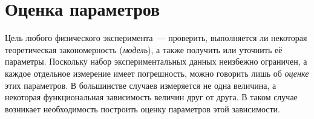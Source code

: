 \chapter{Оценка параметров}
\label{ch:estimate}






Цель любого физического эксперимента~--- проверить, выполняется ли некоторая
теоретическая закономерность (\emph{модель}), а также получить или уточнить
её параметры. Поскольку набор экспериментальных данных неизбежно ограничен,
а каждое отдельное измерение имеет погрешность, можно говорить лишь
об \emph{оценке} этих параметров. В большинстве случаев измеряется не одна
величина, а некоторая функциональная зависимость величин друг от друга.
В таком случае возникает необходимость построить оценку параметров этой зависимости.



